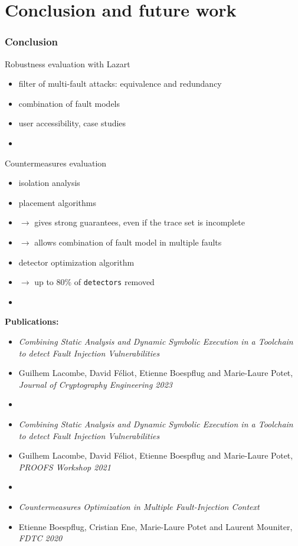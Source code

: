 \section{Conclusion and future work}


\begin{frame} \frametitle{Conclusion} 
{\small


    Robustness evaluation with Lazart
    \begin{itemize}
        \item filter of multi-fault attacks: equivalence and redundancy
        \item combination of fault models
        \item user accessibility, case studies
        \item[] 
    \end{itemize}

    Countermeasures evaluation
    \begin{itemize}
        \item isolation analysis
        \item placement algorithms
        \item[] $\rightarrow$ gives strong guarantees, even if the trace set is incomplete 
        \item[] $\rightarrow$ allows combination of fault model in multiple faults
        \item detector optimization algorithm
        \item[] $\rightarrow$ up to 80\% of \texttt{detectors} removed
        \item[]
    \end{itemize}

     
{\tiny
        \textbf{Publications:}
        \begin{itemize}
            \item \textit{Combining Static Analysis and Dynamic Symbolic Execution in a Toolchain to detect Fault Injection Vulnerabilities}
            \item[] Guilhem Lacombe, David Féliot, Etienne Boespflug and Marie-Laure Potet, \textit{Journal of Cryptography Engineering 2023}
            \item[]
            \item \textit{Combining Static Analysis and Dynamic Symbolic Execution in a Toolchain to detect Fault Injection Vulnerabilities}
            \item[] Guilhem Lacombe, David Féliot, Etienne Boespflug and Marie-Laure Potet, \textit{PROOFS Workshop 2021}
            \item[]
            \item \textit{Countermeasures Optimization in Multiple Fault-Injection Context}
            \item[] Etienne Boespflug, Cristian Ene, Marie-Laure Potet and Laurent Mouniter, \textit{FDTC 2020}
        \end{itemize}
}
\vfill
}
\end{frame}


